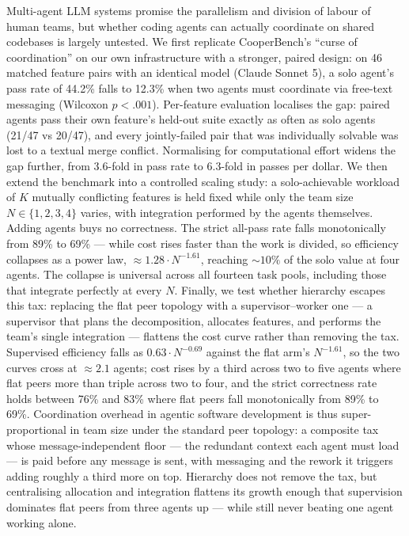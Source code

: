 \documentclass[11pt,a4paper]{article}
\begin{document}
\noindent
Multi-agent LLM systems promise the parallelism and division of labour of human teams, but whether coding agents can actually coordinate on shared codebases is largely untested. We first replicate CooperBench's ``curse of coordination'' on our own infrastructure with a stronger, paired design: on 46 matched feature pairs with an identical model (Claude Sonnet 5), a solo agent's pass rate of 44.2\% falls to 12.3\% when two agents must coordinate via free-text messaging (Wilcoxon $p < .001$). Per-feature evaluation localises the gap: paired agents pass their own feature's held-out suite exactly as often as solo agents (21/47 vs 20/47), and every jointly-failed pair that was individually solvable was lost to a textual merge conflict. Normalising for computational effort widens the gap further, from 3.6-fold in pass rate to 6.3-fold in passes per dollar. We then extend the benchmark into a controlled scaling study: a solo-achievable workload of $K$ mutually conflicting features is held fixed while only the team size $N \in \{1, 2, 3, 4\}$ varies, with integration performed by the agents themselves. Adding agents buys no correctness. The strict all-pass rate falls monotonically from 89\% to 69\% --- while cost rises faster than the work is divided, so efficiency collapses as a power law, $\approx 1.28 \cdot N^{-1.61}$, reaching ${\sim}10\%$ of the solo value at four agents. The collapse is universal across all fourteen task pools, including those that integrate perfectly at every $N$. Finally, we test whether hierarchy escapes this tax: replacing the flat peer topology with a supervisor--worker one --- a supervisor that plans the decomposition, allocates features, and performs the team's single integration --- flattens the cost curve rather than removing the tax. Supervised efficiency falls as $0.63 \cdot N^{-0.69}$ against the flat arm's $N^{-1.61}$, so the two curves cross at ${\approx}2.1$ agents; cost rises by a third across two to five agents where flat peers more than triple across two to four, and the strict correctness rate holds between 76\% and 83\% where flat peers fall monotonically from 89\% to 69\%. Coordination overhead in agentic software development is thus super-proportional in team size under the standard peer topology: a composite tax whose message-independent floor --- the redundant context each agent must load --- is paid before any message is sent, with messaging and the rework it triggers adding roughly a third more on top. Hierarchy does not remove the tax, but centralising allocation and integration flattens its growth enough that supervision dominates flat peers from three agents up --- while still never beating one agent working alone.
\end{document}
